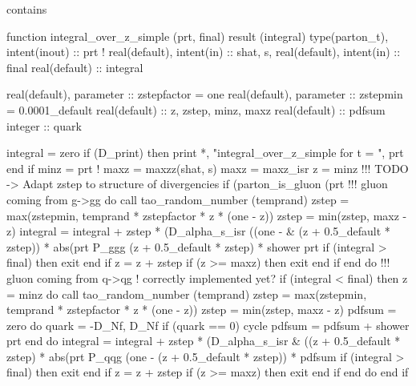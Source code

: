  contains

    function integral_over_z_simple (prt, final) result (integral)
      type(parton_t), intent(inout) :: prt
      ! real(default), intent(in) :: shat, s,
      real(default), intent(in) :: final
      real(default) :: integral

      real(default), parameter :: zstepfactor = one
      real(default), parameter :: zstepmin = 0.0001_default
      real(default) :: z, zstep, minz, maxz
      real(default) :: pdfsum
      integer :: quark

      integral = zero
      if (D_print) then
         print *, "integral_over_z_simple for t = ", prt%
      end if
      minz = prt%
      ! maxz = maxzz(shat, s)
      maxz = maxz_isr
      z = minz
      !!! TODO -> Adapt zstep to structure of divergencies
      if (parton_is_gluon (prt%
         !!! gluon coming from g->gg
         do
            call tao_random_number (temprand)
            zstep = max(zstepmin, temprand * zstepfactor * z * (one - z))
            zstep = min(zstep, maxz - z)
            integral = integral + zstep * (D_alpha_s_isr ((one - &
                 (z + 0.5_default * zstep)) * abs(prt%
                 P_ggg (z + 0.5_default * zstep) * shower%
                 prt%
            if (integral > final) then
               exit
            end if
            z = z + zstep
            if (z >= maxz) then
               exit
            end if
         end do
         !!! gluon coming from q->qg  ! correctly implemented yet?
         if (integral < final) then
            z = minz
            do
               call tao_random_number (temprand)
               zstep = max(zstepmin, temprand * zstepfactor * z * (one - z))
               zstep = min(zstep, maxz - z)
               pdfsum = zero
               do quark = -D_Nf, D_Nf
                  if (quark == 0) cycle
                  pdfsum = pdfsum + shower%
                       prt%
               end do
               integral = integral + zstep * (D_alpha_s_isr &
                    ((z + 0.5_default * zstep) * abs(prt%
                        P_qqg (one - (z + 0.5_default * zstep)) * pdfsum
               if (integral > final) then
                  exit
               end if
               z = z + zstep
               if (z >= maxz) then
                  exit
               end if
            end do
         end if
